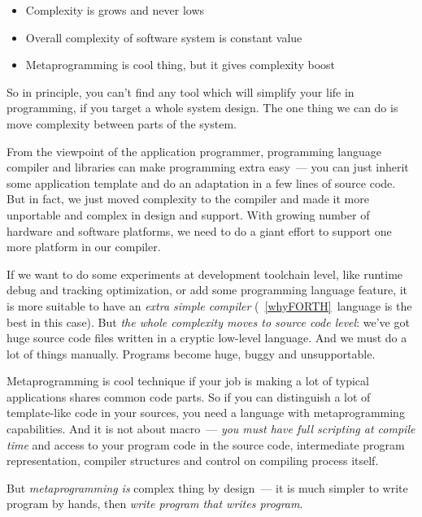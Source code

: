 \clearpage{}

\begin{itemize}
  \item 
Complexity is grows and never lows
  \item
Overall complexity of software system is constant value
  \item
Metaprogramming is cool thing, but it gives complexity boost
\end{itemize}
\noindent
So in principle, you can't find any tool which will simplify your life in
programming, if you target a whole system design. The one thing we can do is
move complexity between parts of the system.

From the viewpoint of the application programmer, programming language compiler
and libraries can make programming extra easy\ --- you can just inherit some
application template and do an adaptation in a few lines of source code. But in
fact, we just moved complexity to the compiler and made it more unportable and
complex in design and support. With growing number of hardware and software
platforms, we need to do a giant effort to support one more platform in our
compiler.

If we want to do some experiments at development toolchain level, like runtime
debug and tracking optimization, or add some programming language feature, it is
more suitable to have an \textit{extra simple compiler} (\F\ \ref{whyFORTH}\
language is the best in this case). But \emph{the whole complexity moves to
source code level}: we've got huge source code files written in a cryptic
low-level language. And we must do a lot of things manually. Programs become
huge, buggy and unsupportable.

Metaprogramming is cool technique if your job is making a lot of typical
applications shares common code parts. So if you can distinguish a lot of
template-like code in your sources, you need a language with metaprogramming
capabilities. And it is not about macro\ --- \emph{you must have full scripting
at compile time} and access to your program code in the source code,
intermediate program representation, compiler structures and control on
compiling process itself.

But \emph{metaprogramming is} complex thing by design\ --- it is much simpler to
write program by hands, then \emph{write program that writes program}.

